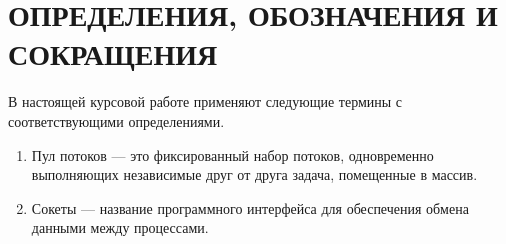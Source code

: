 \section*{\large ОПРЕДЕЛЕНИЯ, ОБОЗНАЧЕНИЯ И СОКРАЩЕНИЯ}

В настоящей курсовой работе применяют следующие термины с соответствующими определениями.


\begin{enumerate}
	\item Пул потоков --- это фиксированный набор потоков, одновременно выполняющих независимые друг от друга задача,
	помещенные в массив.
	\item Сокеты --- название программного интерфейса для обеспечения обмена данными между процессами.
\end{enumerate}
\pagebreak